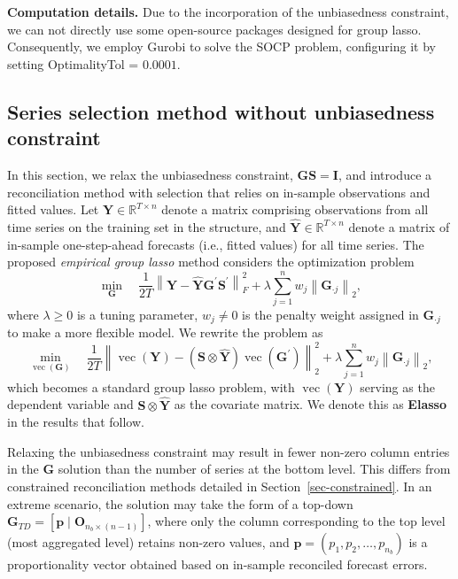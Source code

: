 \documentclass[
  11pt]{article}
\begin{document}
\textbf{Computation details.} Due to the incorporation of the
unbiasedness constraint, we can not directly use some open-source
packages designed for group lasso. Consequently, we employ Gurobi to
solve the SOCP problem, configuring it by setting OptimalityTol =
\(0.0001\).

\hypertarget{sec-unconstrained}{%
\subsection{Series selection method without unbiasedness
constraint}\label{sec-unconstrained}}

In this section, we relax the unbiasedness constraint,
\(\bm{G}\bm{S} = \bm{I}\), and introduce a reconciliation method with
selection that relies on in-sample observations and fitted values. Let
\(\bm{Y} \in \mathbb{R}^{T \times n}\) denote a matrix comprising
observations from all time series on the training set in the structure,
and \(\hat{\bm{Y}} \in \mathbb{R}^{T \times n}\) denote a matrix of
in-sample one-step-ahead forecasts (i.e., fitted values) for all time
series. The proposed \emph{empirical group lasso} method considers the
optimization problem \[
\min_{\bm{G}} \quad \frac{1}{2 T} \left\|\bm{Y}-\hat{\bm{Y}} \bm{G}^{\prime} \bm{S}^{\prime}\right\|_F^2 + \lambda \sum_{j=1}^n w_j \left\|\bm{G}_{\cdot j}\right\|_2,
\] where \(\lambda \geq 0\) is a tuning parameter, \(w_j \neq 0\) is the
penalty weight assigned in \(\bm{G}_{\cdot j}\) to make a more flexible
model. We rewrite the problem as \[
\min_{\operatorname{vec}(\bm{G})} \quad \frac{1}{2 T} \left\|\operatorname{vec}(\bm{Y})-(\bm{S} \otimes \hat{\bm{Y}}) \operatorname{vec}\left(\bm{G}^{\prime}\right)\right\|_2^2 + \lambda \sum_{j=1}^n w_j \left\|\bm{G}_{\cdot j}\right\|_2,
\] which becomes a standard group lasso problem, with
\(\operatorname{vec}(\bm{Y})\) serving as the dependent variable and
\(\bm{S} \otimes \hat{\bm{Y}}\) as the covariate matrix. We denote this
as \textbf{Elasso} in the results that follow.

Relaxing the unbiasedness constraint may result in fewer non-zero column
entries in the \(\bm{G}\) solution than the number of series at the
bottom level. This differs from constrained reconciliation methods
detailed in Section~\ref{sec-constrained}. In an extreme scenario, the
solution may take the form of a top-down
\(\bm{G}_{TD}=[\bm{p} \mid \bm{O}_{n_b \times (n-1)}]\), where only the
column corresponding to the top level (most aggregated level) retains
non-zero values, and \(\bm{p} = (p_1, p_2, \ldots, p_{n_b})\) is a
proportionality vector obtained based on in-sample reconciled forecast
errors.
\end{document}
